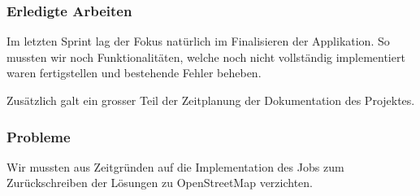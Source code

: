 \subsubsection{Erledigte Arbeiten}

Im letzten Sprint lag der Fokus natürlich im Finalisieren der Applikation.
So mussten wir noch Funktionalitäten, welche noch nicht vollständig implementiert waren fertigstellen und bestehende Fehler beheben.

Zusätzlich galt ein grosser Teil der Zeitplanung der Dokumentation des Projektes.

\subsubsection{Probleme}
Wir mussten aus Zeitgründen auf die Implementation des Jobs zum Zurückschreiben der Lösungen zu OpenStreetMap verzichten.

